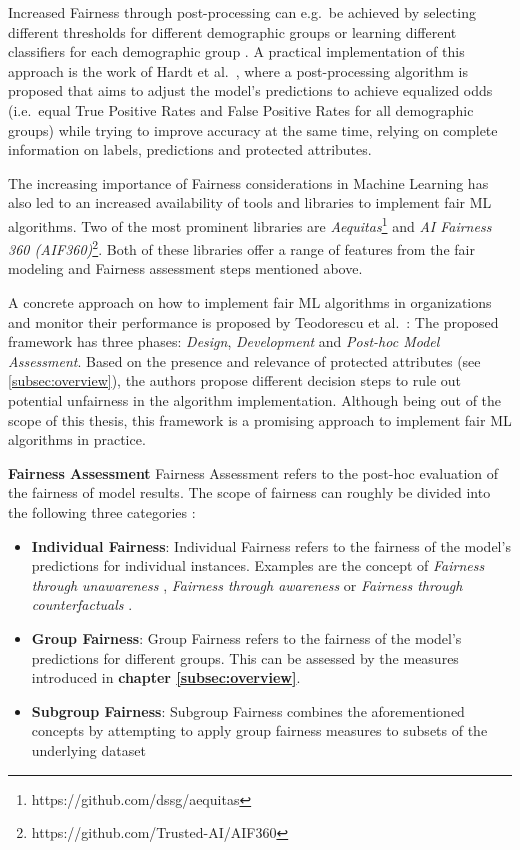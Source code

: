 Increased Fairness through post-processing can e.g.\ be achieved by selecting different thresholds for different demographic groups or learning different classifiers for each demographic group \parencite{Pessach2020}.
A practical implementation of this approach is the work of Hardt et al.\ \parencite{Hardt2016}, where a post-processing algorithm is proposed that aims to adjust the model's predictions to achieve equalized odds (i.e.\ equal True Positive Rates and False Positive Rates for all demographic groups) while trying to improve accuracy at the same time, relying on complete information on labels, predictions and protected attributes. 


The increasing importance of Fairness considerations in Machine Learning has also led to an increased availability of tools and libraries to implement fair ML algorithms.
Two of the most prominent libraries are \textit{Aequitas}\footnote{https://github.com/dssg/aequitas} and \textit{AI Fairness 360 (AIF360)}\footnote{https://github.com/Trusted-AI/AIF360}.
Both of these libraries offer a range of features from the fair modeling and Fairness assessment steps mentioned above.

A concrete approach on how to implement fair ML algorithms in organizations and monitor their performance is proposed by Teodorescu et al.\ \parencite{Teodorescu2020}:
The proposed framework has three phases: \textit{Design}, \textit{Development} and \textit{Post-hoc Model Assessment}. Based on the presence and relevance of protected attributes (see \autoref{subsec:overview}), the authors propose different decision steps to rule out potential unfairness in the algorithm implementation.
Although being out of the scope of this thesis, this framework is a promising approach to implement fair ML algorithms in practice.

\textbf{Fairness Assessment} \newline
Fairness Assessment refers to the post-hoc evaluation of the fairness of model results. The scope of fairness can roughly be divided into the following three categories \parencite{Mehrabi2021}:
\begin{itemize}
    \item \textbf{Individual Fairness}: Individual Fairness refers to the fairness of the model's predictions for individual instances. Examples are the concept of \textit{Fairness through unawareness} \parencite{Kusner2017},  \textit{Fairness through awareness} \parencite{Dwork2012} or \textit{Fairness through counterfactuals} \parencite{Kusner2017}.
    \item \textbf{Group Fairness}: Group Fairness refers to the fairness of the model's predictions for different groups. This can be assessed by the measures introduced in \textbf{chapter \ref{subsec:overview}}.
    \item \textbf{Subgroup Fairness}: Subgroup Fairness combines the aforementioned concepts by attempting to apply group fairness measures to subsets of the underlying dataset \parencite{Kearns2019}
\end{itemize}


